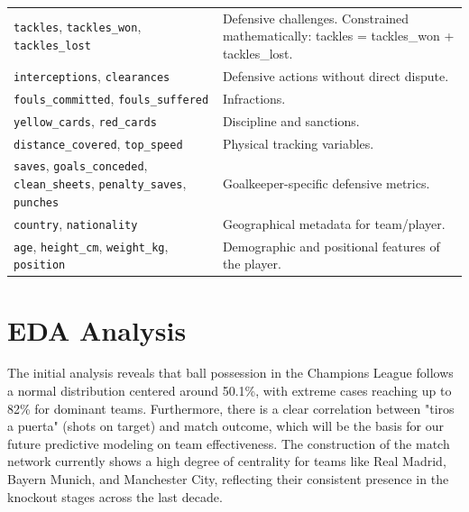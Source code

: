 \documentclass[12pt,a4paper]{article}
\begin{document}
\begin{longtable}{p{5.5cm}p{9cm}}
\texttt{tackles}, \texttt{tackles\_won}, \texttt{tackles\_lost} & Defensive challenges. Constrained mathematically: tackles = tackles\_won + tackles\_lost. \\
\texttt{interceptions}, \texttt{clearances} & Defensive actions without direct dispute. \\
\texttt{fouls\_committed}, \texttt{fouls\_suffered} & Infractions. \\
\texttt{yellow\_cards}, \texttt{red\_cards} & Discipline and sanctions. \\
\texttt{distance\_covered}, \texttt{top\_speed} & Physical tracking variables. \\
\texttt{saves}, \texttt{goals\_conceded}, \texttt{clean\_sheets}, \texttt{penalty\_saves}, \texttt{punches} & Goalkeeper-specific defensive metrics. \\
\texttt{country}, \texttt{nationality} & Geographical metadata for team/player. \\
\texttt{age}, \texttt{height\_cm}, \texttt{weight\_kg}, \texttt{position} & Demographic and positional features of the player. \\
\bottomrule
\end{longtable}

\appendix
\section{EDA Analysis}

The initial analysis reveals that ball possession in the Champions League follows a normal distribution centered around 50.1\%, with extreme cases reaching up to 82\% for dominant teams. Furthermore, there is a clear correlation between "tiros a puerta" (shots on target) and match outcome, which will be the basis for our future predictive modeling on team effectiveness. The construction of the match network currently shows a high degree of centrality for teams like Real Madrid, Bayern Munich, and Manchester City, reflecting their consistent presence in the knockout stages across the last decade.
\end{document}
